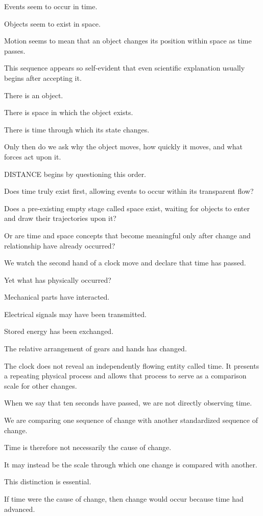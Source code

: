 Events seem to occur in time.

Objects seem to exist in space.

Motion seems to mean that an object changes its position within space as time passes.

This sequence appears so self-evident that even scientific explanation usually begins after accepting it.

There is an object.

There is space in which the object exists.

There is time through which its state changes.

Only then do we ask why the object moves, how quickly it moves, and what forces act upon it.

DISTANCE begins by questioning this order.

Does time truly exist first, allowing events to occur within its transparent flow?

Does a pre-existing empty stage called space exist, waiting for objects to enter and draw their trajectories upon it?

Or are time and space concepts that become meaningful only after change and relationship have already occurred?

We watch the second hand of a clock move and declare that time has passed.

Yet what has physically occurred?

Mechanical parts have interacted.

Electrical signals may have been transmitted.

Stored energy has been exchanged.

The relative arrangement of gears and hands has changed.

The clock does not reveal an independently flowing entity called time. It presents a repeating physical process and allows that process to serve as a comparison scale for other changes.

When we say that ten seconds have passed, we are not directly observing time.

We are comparing one sequence of change with another standardized sequence of change.

Time is therefore not necessarily the cause of change.

It may instead be the scale through which one change is compared with another.

This distinction is essential.

If time were the cause of change, then change would occur because time had advanced.

